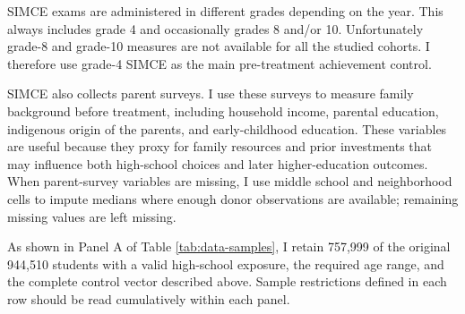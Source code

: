\documentclass[a4paper, article, english, oneside, unknownkeysallowed, 12pt]{memoir}
\begin{document}
SIMCE exams are administered in different grades depending on the year. 
This always includes grade 4 and occasionally grades 8 and/or 10.
Unfortunately grade-8 and grade-10 measures are not available for all the studied cohorts.
I therefore use grade-4 SIMCE as the main pre-treatment achievement control.

SIMCE also collects parent surveys.
I use these surveys to measure family background before treatment, including household income, parental education, indigenous origin of the parents, and early-childhood education.
These variables are useful because they proxy for family resources and prior investments that may influence both high-school choices and later higher-education outcomes.
When parent-survey variables are missing, I use middle school and neighborhood cells to impute medians where enough donor observations are available; remaining missing values are left missing.


As shown in Panel A of Table \ref{tab:data-samples}, I retain 757,999 of the original 944,510 students with a valid high-school exposure, the required age range, and the complete control vector described above.
Sample restrictions defined in each row should be read cumulatively within each panel.
\end{document}
